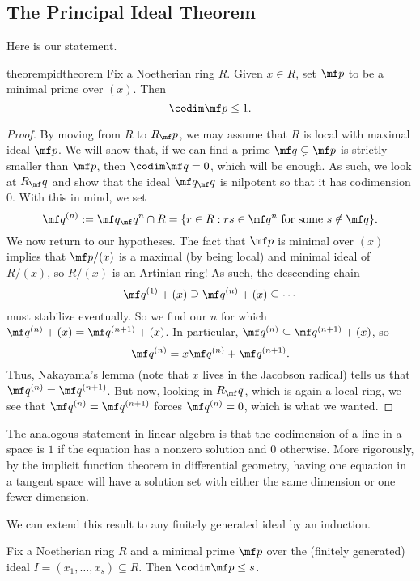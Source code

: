 \subsection{The Principal Ideal Theorem}
Here is our statement.
\begin{restatable}{theorem}{pidtheorem}
	Fix a Noetherian ring $R$. Given $x\in R$, set $\mf p$ to be a minimal prime over $(x)$. Then
	\[\codim\mf p\le1.\]
\end{restatable}
\begin{proof}
	By moving from $R$ to $R_\mf p$, we may assume that $R$ is local with maximal ideal $\mf p$. We will show that, if we can find a prime $\mf q\subsetneq\mf p$ is strictly smaller than $\mf p$, then $\codim\mf q=0$, which will be enough. As such, we look at $R_\mf q$ and show that the ideal $\mf q_\mf q$ is nilpotent so that it has codimension $0$. With this in mind, we set
	\[\mf q^{(n)}:=\mf q_\mf q^n\cap R=\{r\in R:rs\in\mf q^n\text{ for some }s\notin\mf q\}.\]
	We now return to our hypotheses. The fact that $\mf p$ is minimal over $(x)$ implies that $\mf p/(x)$ is a maximal (by being local) and minimal ideal of $R/(x)$, %
	so $R/(x)$ is an Artinian ring! As such, the descending chain
	\[\mf q^{(1)}+(x)\supseteq\mf q^{(n)}+(x)\subseteq\cdots\]
	must stabilize eventually. So we find our $n$ for which $\mf q^{(n)}+(x)=\mf q^{(n+1)}+(x)$. In particular, $\mf q^{(n)}\subseteq\mf q^{(n+1)}+(x)$, so
	\[\mf q^{(n)}=x\mf q^{(n)}+\mf q^{(n+1)}.\]
	Thus, Nakayama's lemma (note that $x$ lives in the Jacobson radical) tells us that $\mf q^{(n)}=\mf q^{(n+1)}$. But now, looking in $R_\mf q$, which is again a local ring, we see that $\mf q^{(n)}=\mf q^{(n+1)}$ forces $\mf q^{(n)}=0$, which is what we wanted.
\end{proof}
\begin{remark}
	The analogous statement in linear algebra is that the codimension of a line in a space is $1$ if the equation has a nonzero solution and $0$ otherwise. More rigorously, by the implicit function theorem in differential geometry, having one equation in a tangent space will have a solution set with either the same dimension or one fewer dimension.
\end{remark}
We can extend this result to any finitely generated ideal by an induction.
\begin{theorem}
	Fix a Noetherian ring $R$ and a minimal prime $\mf p$ over the (finitely generated) ideal $I=(x_1,\ldots,x_s)\subseteq R$. Then $\codim\mf p\le s$.
\end{theorem}
